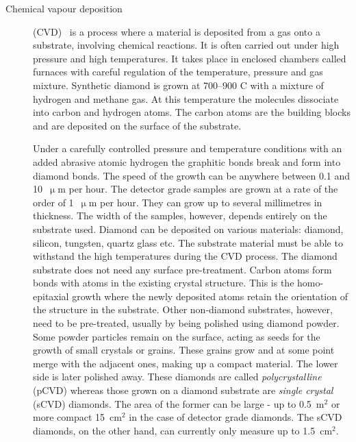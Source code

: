 \begin{description}
\item[Chemical vapour deposition] (CVD)~\cite{} is a process where a material is deposited from a gas onto a substrate, involving chemical reactions. It is often carried out under high pressure and high temperatures. It takes place in enclosed chambers called furnaces with careful regulation of the temperature, pressure and gas mixture. Synthetic diamond is grown at 700--900 \textdegree C with a mixture of hydrogen and methane gas. At this temperature the molecules dissociate into carbon and hydrogen atoms. The carbon atoms are the building blocks and are deposited on the surface of the substrate.

Under a carefully controlled pressure and temperature conditions with an added abrasive atomic hydrogen the graphitic bonds break and form into diamond bonds. The speed of the growth can be anywhere between 0.1 and 10~$\upmu$m per hour. The detector grade samples are grown at a rate of the order of 1~$\upmu$m per hour. They can grow up to several millimetres in thickness. The width of the samples, however, depends entirely on the substrate used. Diamond can be deposited on various materials: diamond, silicon, tungsten, quartz glass etc. The substrate material must be able to withstand the high temperatures during the CVD process. The diamond substrate does not need any surface pre-treatment. Carbon atoms form bonds with atoms in the existing crystal structure. This is the homo-epitaxial growth where the newly deposited atoms retain the orientation of the structure in the substrate. Other non-diamond substrates, however, need to be pre-treated, usually by being polished using diamond powder. Some powder particles remain on the surface, acting as seeds for the growth of small crystals or grains. These grains grow and at some point merge with the adjacent ones, making up a compact material. The lower side is later polished away. These diamonds are called \emph{polycrystalline} (pCVD) whereas those grown on a diamond substrate are \emph{single crystal} (sCVD) diamonds. The area of the former can be large - up to 0.5~m$^2$ or more compact 15~cm$^2$ in the case of detector grade diamonds. The sCVD diamonds, on the other hand, can currently only measure up to 1.5~cm$^2$.
\end{description}

